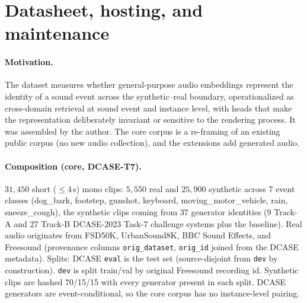 \documentclass{article}
\begin{document}
\clearpage




\clearpage

\appendix
\renewcommand{\thetable}{A\arabic{table}}
\renewcommand{\thefigure}{A\arabic{figure}}
\setcounter{table}{0}
\setcounter{figure}{0}
\section{Datasheet, hosting, and maintenance}
\label{app:datasheet}

\paragraph{Motivation.} The dataset measures whether general-purpose audio embeddings represent the
identity of a sound event across the synthetic--real boundary, operationalized as
cross-domain retrieval at sound event and instance level, with heads that make the representation
deliberately invariant or sensitive to the rendering process. It was assembled by the author. The
core corpus is a re-framing of an existing public corpus (no new audio collection), and the
extensions add generated audio.

\paragraph{Composition (core, DCASE-T7).} $31{,}450$ short ($\le\!4$\,s) mono clips: $5{,}550$ real
and $25{,}900$ synthetic across 7 event classes (dog\_bark, footstep, gunshot, keyboard,
moving\_motor\_vehicle, rain, sneeze\_cough), the synthetic clips coming from 37 generator
identities (9 Track-A and 27 Track-B DCASE-2023 Task-7 challenge systems plus the baseline). Real
audio originates from FSD50K, UrbanSound8K, BBC Sound Effects, and Freesound (provenance columns
\texttt{orig\_dataset}, \texttt{orig\_id} joined from the DCASE metadata). Splits: DCASE
\texttt{eval} is the test set (source-disjoint from \texttt{dev} by construction). \texttt{dev} is
split train/val by original Freesound recording id. Synthetic clips are hashed 70/15/15 with every
generator present in each split. DCASE generators are event-conditional, so the core corpus has
no instance-level pairing.
\end{document}
